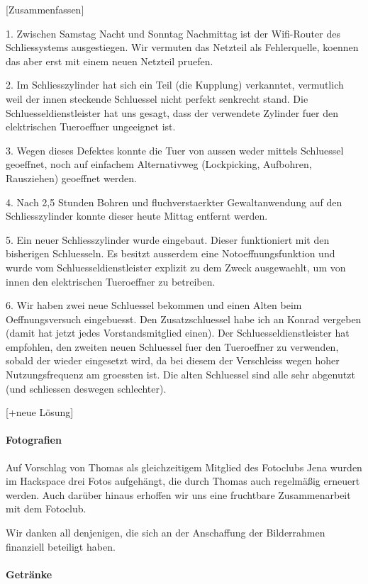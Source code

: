 \documentclass[10pt,DIV16]{scrartcl}
\begin{document}
[Zusammenfassen]

1. Zwischen Samstag Nacht und Sonntag Nachmittag ist der Wifi-Router des
Schliessystems ausgestiegen. Wir vermuten das Netzteil als Fehlerquelle,
koennen das aber erst mit einem neuen Netzteil pruefen.

2. Im Schliesszylinder hat sich ein Teil (die Kupplung) verkanntet,
vermutlich weil der innen steckende Schluessel nicht perfekt senkrecht
stand. Die Schluesseldienstleister hat uns gesagt, dass der verwendete
Zylinder fuer den elektrischen Tueroeffner ungeeignet ist.

3. Wegen dieses Defektes konnte die Tuer von aussen weder mittels
Schluessel geoeffnet, noch auf einfachem Alternativweg (Lockpicking,
Aufbohren, Rausziehen) geoeffnet werden.

4. Nach 2,5 Stunden Bohren und fluchverstaerkter Gewaltanwendung auf den
Schliesszylinder konnte dieser heute Mittag entfernt werden.

5. Ein neuer Schliesszylinder wurde eingebaut. Dieser funktioniert mit
den bisherigen Schluesseln. Es besitzt ausserdem eine
Notoeffnungsfunktion und wurde vom Schluesseldienstleister explizit zu
dem Zweck ausgewaehlt, um von innen den elektrischen Tueroeffner zu
betreiben.

6. Wir haben zwei neue Schluessel bekommen und einen Alten beim
Oeffnungsversuch eingebuesst. Den Zusatzschluessel habe ich an Konrad
vergeben (damit hat jetzt jedes Vorstandsmitglied einen). Der
Schluesseldienstleister hat empfohlen, den zweiten neuen Schluessel fuer
den Tueroeffner zu verwenden, sobald der wieder eingesetzt wird, da bei
diesem der Verschleiss wegen hoher Nutzungsfrequenz am groessten ist.
Die alten Schluessel sind alle sehr abgenutzt (und schliessen deswegen
schlechter).

[+neue Lösung]

\paragraph{Fotografien}

Auf Vorschlag von Thomas als gleichzeitigem Mitglied des Fotoclubs Jena wurden
im Hackspace drei Fotos aufgehängt, die durch Thomas auch regelmäßig erneuert
werden.  Auch darüber hinaus erhoffen wir uns eine fruchtbare Zusammenarbeit
mit dem Fotoclub.

Wir danken all denjenigen, die sich an der Anschaffung der Bilderrahmen
finanziell beteiligt haben.

\paragraph{Getränke}
\end{document}
